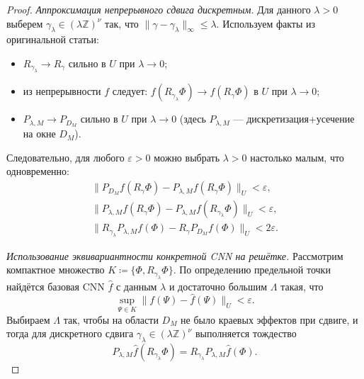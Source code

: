 \documentclass[../NDCNNAI_main.tex]{subfiles}
\begin{document}
\begin{proof}
\emph{Аппроксимация непрерывного сдвига дискретным.}
Для данного $\lambda>0$ выберем $\gamma_\lambda\in (\lambda\mathbb{Z})^\nu$ так, что
$\|\gamma-\gamma_\lambda\|_\infty\le \lambda$.
Используем факты из оригинальной статьи:
\begin{itemize}
\item $R_{\gamma_\lambda}\to R_\gamma$ сильно в $U$ при $\lambda\to 0$;
\item из непрерывности $f$ следует: $f(R_{\gamma_\lambda}\Phi)\to f(R_\gamma\Phi)$ в $U$ при $\lambda\to 0$;
\item $P_{\lambda,M}\to P_{D_M}$ сильно в $U$ при $\lambda\to 0$ (здесь $P_{\lambda,M}$ --- дискретизация+усечение на окне $D_M$).
\end{itemize}
Следовательно, для любого $\varepsilon>0$ можно выбрать $\lambda>0$ настолько малым, что одновременно:
\begin{gather}
\|P_{D_M}f(R_\gamma\Phi)-P_{\lambda,M}f(R_\gamma\Phi)\|_U <\varepsilon,\label{eq:a1}\\
\|P_{\lambda,M}f(R_\gamma\Phi)-P_{\lambda,M}f(R_{\gamma_\lambda}\Phi)\|_U <\varepsilon,\label{eq:a2}\\
\|R_{\gamma_\lambda}P_{\lambda,M}f(\Phi)-R_\gamma P_{D_M}f(\Phi)\|_U <2\varepsilon.\label{eq:a3}
\end{gather}

\emph{Использование эквивариантности конкретной CNN на решётке.}
Рассмотрим компактное множество $K\coloneq \{\Phi,R_{\gamma_\lambda}\Phi\}$.
По определению предельной точки найдётся базовая CNN $\widehat f$ с данным $\lambda$ и достаточно большим $\Lambda$
такая, что
\begin{equation}
\sup_{\Psi\in K}\|f(\Psi)-\widehat f(\Psi)\|_U<\varepsilon.
\label{eq:a4}  
\end{equation}
Выбираем $\Lambda$ так, чтобы на области $D_M$ не было краевых эффектов при сдвиге,
и тогда для дискретного сдвига $\gamma_\lambda\in(\lambda\mathbb{Z})^\nu$ выполняется тождество
\begin{equation}
P_{\lambda,M}\widehat f(R_{\gamma_\lambda}\Phi)=R_{\gamma_\lambda}P_{\lambda,M}\widehat f(\Phi).
\label{eq:disc_equiv}
\end{equation}


\end{proof}
\end{document}
